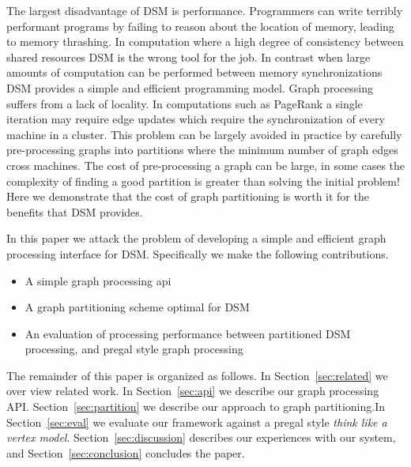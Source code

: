 The largest disadvantage of DSM is performance. Programmers can write
terribly performant programs by failing to reason about the location
of memory, leading to memory thrashing. In computation where a high
degree of consistency between shared resources DSM is the wrong tool
for the job. In contrast when large amounts of computation can be
performed between memory synchronizations DSM provides a simple and
efficient programming model. Graph processing suffers from a lack of
locality. In computations such as PageRank a single iteration may
require edge updates which require the synchronization of every
machine in a cluster. This problem can be largely avoided in practice
by carefully pre-processing graphs into partitions where the minimum
number of graph edges cross machines. The cost of pre-processing a
graph can be large, in some cases the complexity of finding a good
partition is greater than solving the initial problem! Here we
demonstrate that the cost of graph partitioning is worth it for the
benefits that DSM provides.

In this paper we attack the problem of developing a simple and
efficient graph processing interface for DSM. Specifically we make the
following contributions.

\begin{itemize}
        \item A simple graph processing api
        \item A graph partitioning scheme optimal for DSM
        \item An evaluation of processing performance between partitioned DSM processing, and pregal style graph processing
\end{itemize}

The remainder of this paper is organized as follows. In
Section~\ref{sec:related} we over view related work. In
Section~\ref{sec:api} we describe our graph processing API.
Section~\ref{sec:partition} we describe our approach to graph
partitioning.In Section~\ref{sec:eval} we evaluate our framework
against a pregal style \textit{think like a vertex model}.
Section~\ref{sec:discussion} describes our experiences with our
system, and Section~\ref{sec:conclusion} concludes the paper.




